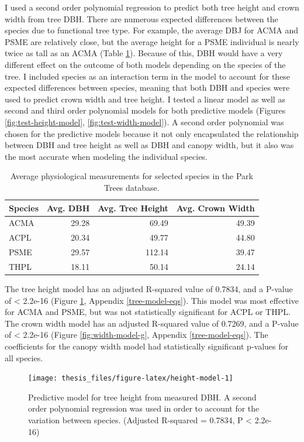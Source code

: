 \documentclass[12pt,twoside]{reedthesis}
\begin{document}
I used a second order polynomial regression to predict both tree height and crown width from tree DBH. There are numerous expected differences between the species due to functional tree type. For example, the average DBJ for ACMA and PSME are relatively close, but the average height for a PSME individual is nearly twice as tall as an ACMA (Table \ref{tab:tree-stats-table}). Because of this, DBH would have a very different effect on the outcome of both models depending on the species of the tree. I included species as an interaction term in the model to account for these expected differences between species, meaning that both DBH and species were used to predict crown width and tree height. I tested a linear model as well as second and third order polynomial models for both predictive models (Figures \ref{fig:test-height-model}, \ref{fig:test-width-model}). A second order polynomial was chosen for the predictive models because it not only encapsulated the relationship between DBH and tree height as well as DBH and canopy width, but it also was the most accurate when modeling the individual species.
\begin{table}

\caption[Physiological Tree Measurements]{\label{tab:tree-stats-table}Average physiological measurements for selected species in the Park Trees database.}
\centering
\begin{tabular}[t]{lrrr}
\toprule
Species & Avg. DBH & Avg. Tree Height & Avg. Crown Width\\
\midrule
ACMA & 29.28 & 69.49 & 49.39\\
ACPL & 20.34 & 49.77 & 44.80\\
PSME & 29.57 & 112.14 & 39.47\\
THPL & 18.11 & 50.14 & 24.14\\
\bottomrule
\end{tabular}
\end{table}
The tree height model has an adjusted R-squared value of 0.7834, and a P-value of \textless{} 2.2e-16 (Figure \ref{fig:height-model}, Appendix \ref{tree-model-eqs}). This model was most effective for ACMA and PSME, but was not statistically significant for ACPL or THPL. The crown width model has an adjusted R-squared value of 0.7269, and a P-value of \textless{} 2.2e-16 (Figure \ref{fig:width-model-g}, Appendix \ref{tree-model-eqs}). The coefficients for the canopy width model had statistically significant p-values for all species.
\begin{figure}

{\centering \texttt{[image: thesis\_files/figure-latex/height-model-1]} 

}

\caption[Tree height predictive model]{Predictive model for tree height from measured DBH. A second order polynomial regression was used in order to account for the variation between species. (Adjusted R-squared = 0.7834, P < 2.2e-16)}\label{fig:height-model}
\end{figure}
\end{document}
